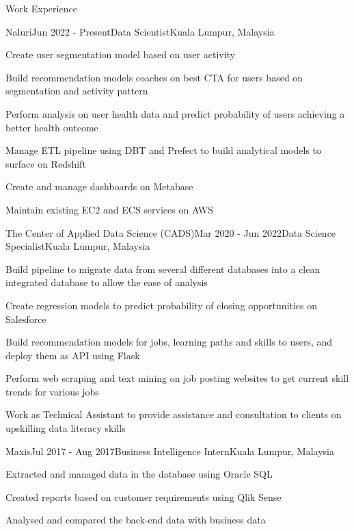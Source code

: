 \documentclass{techresume} %
\begin{document}
\begin{rSection}{Work Experience}

\begin{rSubsection}{Naluri}{Jun 2022 - Present}{Data Scientist}{Kuala Lumpur, Malaysia}
    \item Create user segmentation model based on user activity
    \item Build recommendation models coaches on best CTA for users based on segmentation and activity pattern
    \item Perform analysis on user health data and predict probability of users achieving a better health outcome
    \item Manage ETL pipeline using DBT and Prefect to build analytical models to surface on Redshift
    \item Create and manage dashboards on Metabase
    \item Maintain existing EC2 and ECS services on AWS
\end{rSubsection}

\begin{rSubsection}{The Center of Applied Data Science (CADS)}{Mar 2020 - Jun 2022}{Data Science Specialist}{Kuala Lumpur, Malaysia}
    \item Build pipeline to migrate data from several different databases into a clean integrated database to allow the ease of analysis
    \item Create regression models to predict probability of closing opportunities on Salesforce
    \item Build recommendation models for jobs, learning paths and skills to users, and deploy them as API using Flask
    \item Perform web scraping and text mining on job posting websites to get current skill trends for various jobs
    \item Work as Technical Assistant to provide assistance and consultation to clients on upskilling data literacy skills
\end{rSubsection}

\begin{rSubsection}{Maxis}{Jul 2017 - Aug 2017}{Business Intelligence Intern}{Kuala Lumpur, Malaysia}
    \item Extracted and managed data in the database using Oracle SQL
    \item Created reports based on customer requirements using Qlik Sense
    \item Analysed and compared the back-end data with business data
\end{rSubsection}

\end{rSection}
\end{document}
